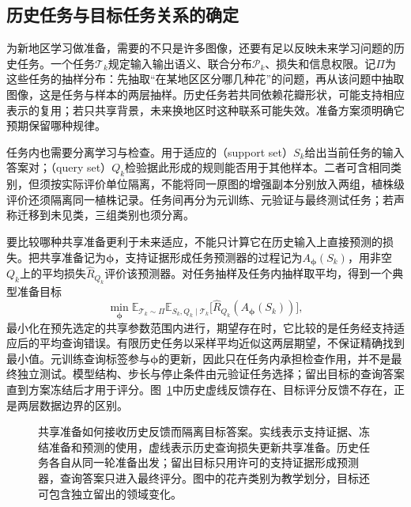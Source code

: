\subsection{历史任务与目标任务关系的确定}
\label{sec:ket-transfer-task-splits}

为新地区学习做准备，需要的不只是许多图像，还要有足以反映未来学习问题的历史任务。一个任务$\mathcal T_k$规定输入输出语义、联合分布$\mathcal P_k$、损失和信息权限。记$\Pi$为这些任务的抽样分布：先抽取“在某地区区分哪几种花”的问题，再从该问题中抽取图像，这是任务与样本的两层抽样。历史任务若共同依赖花瓣形状，可能支持相应表示的复用；若只共享背景，未来换地区时这种联系可能失效。准备方案须明确它预期保留哪种规律。

任务内也需要分离学习与检查。用于适应的（support set）$S_k$给出当前任务的输入答案对；（query set）$Q_k$检验据此形成的规则能否用于其他样本。二者可含相同类别，但须按实际评价单位隔离，不能将同一原图的增强副本分别放入两组，植株级评价还须隔离同一植株记录。任务间再分为元训练、元验证与最终测试任务；若声称迁移到未见类，三组类别也须分离。

要比较哪种共享准备更利于未来适应，不能只计算它在历史输入上直接预测的损失。把共享准备记为$\bm\phi$，支持证据形成任务预测器的过程记为$A_{\bm\phi}(S_k)$，用非空$Q_k$上的平均损失$\hat R_{Q_k}$评价该预测器。对任务抽样及任务内抽样取平均，得到一个典型准备目标
\begin{equation}
  \min_{\bm{\phi}}
  \mathbb E_{\mathcal T_k\sim\Pi}
  \mathbb E_{S_k,Q_k\mid\mathcal T_k}
  \bigl[\hat R_{Q_k}(A_{\bm{\phi}}(S_k))\bigr],
  \label{eq:ket-transfer-meta-objective}
\end{equation}
最小化在预先选定的共享参数范围内进行，期望存在时，它比较的是任务经支持适应后的平均查询错误。有限历史任务以采样平均近似这两层期望，不保证精确找到最小值。元训练查询标签参与$\bm\phi$的更新，因此只在任务内承担检查作用，并不是最终独立测试。模型结构、步长与停止条件由元验证任务选择；留出目标的查询答案直到方案冻结后才用于评分。图~\ref{fig:ket-transfer-data-boundaries}中历史虚线反馈存在、目标评分反馈不存在，正是两层数据边界的区别。

\begin{figure}[htbp]
  \centering
  
  \caption{共享准备如何接收历史反馈而隔离目标答案。实线表示支持证据、冻结准备和预测的使用，虚线表示历史查询损失更新共享准备。历史任务各自从同一轮准备出发；留出目标只用许可的支持证据形成预测器，查询答案只进入最终评分。图中的花卉类别为教学划分，目标还可包含独立留出的领域变化。}
  \label{fig:ket-transfer-data-boundaries}
\end{figure}


